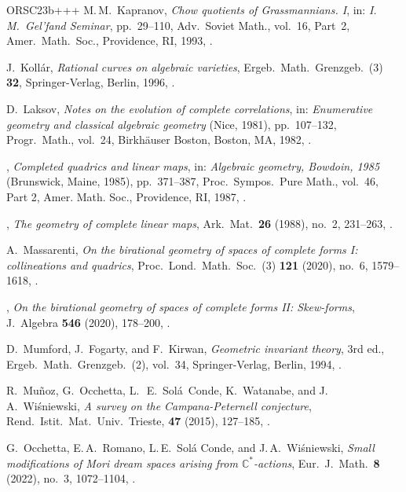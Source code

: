 \begin{thebibliography}{ORSC\etalchar{+}23b+++}
M.\,M.~Kapranov, 
\emph{Chow quotients of Grassmannians. {I}},
in: \emph{I.\,{M}.~{G}el'fand {S}eminar},  pp.~29--110,  Adv.\ Soviet
Math., vol.~16, Part~2,
Amer.\ Math.\ Soc., Providence, RI, 1993,
.

J.~Koll{\'a}r, 
\emph{Rational curves on algebraic varieties},
Ergeb.\ Math.\ Grenzgeb.\ (3) \textbf{32}, Springer-Verlag, Berlin, 1996, 
  . 

D.~Laksov, 
\emph{Notes on the evolution of complete correlations}, 
in: \emph{Enumerative geometry and classical algebraic geometry}
  ({N}ice, 1981), pp.~107--132, Progr.\ Math., vol.~24, 
Birkh\"auser Boston, Boston, MA, 1982,
.

\bysame,
\emph{Completed quadrics and linear maps}, 
 in: \emph{Algebraic geometry, {B}owdoin, 1985} ({B}runswick, {M}aine,
  1985), pp.~371--387, Proc.\ Sympos.\ Pure Math., vol.~46, Part 2,
  Amer. Math. Soc., Providence, RI, 1987,
  .

\bysame, 
\emph{The geometry of complete linear maps}, 
Ark.\ Mat.\  \textbf{26} (1988), no.~2, 231--263,
.

A.~Massarenti, 
\emph{On the birational geometry of spaces of complete forms {I}:
  collineations and quadrics}, 
Proc.\ Lond.\ Math.\ Soc.~(3) \textbf{121} (2020), no.~6, 1579--1618,
.

\bysame,
\emph{On the birational geometry of spaces of complete forms {II}:
  {S}kew-forms}, 
J.~Algebra \textbf{546} (2020), 178--200,
.

D.~Mumford, J.~Fogarty, and F.~Kirwan, 
\emph{Geometric invariant theory}, 3rd ed., Ergeb.\ Math.\ Grenzgeb.~(2), 
vol.~34,  Springer-Verlag, Berlin, 1994,
.

R.~Mu{\~n}oz, G.~Occhetta, L.\,~E.~Sol{\'a}~Conde, K.~Watanabe,
  and J.\,A.~Wi\'sniewski, 
\emph{A survey on the Campana-Peternell conjecture}, 
Rend.\ Istit.\ Mat.\ Univ.\ Trieste, \textbf{47} (2015), 127--185,
.

 G.~Occhetta, E.\,A.~Romano, L.\,E.~Sol\'a Conde, and J.\,A.~Wi\'sniewski, 
\emph{Small modifications of Mori dream spaces arising from
  {$\mathbb{C}^*$}-actions}, 
Eur.~J.\ Math.\ \textbf{8} (2022), no.~3, 1072--1104,
.




\end{thebibliography}
